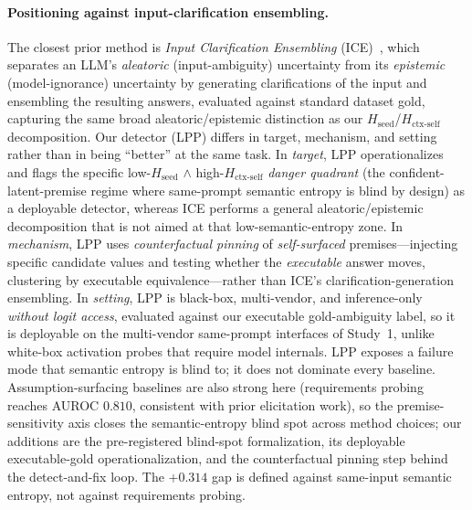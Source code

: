 \documentclass[acmsmall,screen,nonacm]{acmart}
\newcommand{\Hseed}{\ensuremath{H_{\mathrm{seed}}}}
\newcommand{\Hctx}{\ensuremath{H_{\text{ctx-self}}}}
\begin{document}
\paragraph{Positioning against input-clarification ensembling.} The closest prior method is
\emph{Input Clarification Ensembling} (ICE)~\cite{hou2024decomposing}, which separates an LLM's
\emph{aleatoric} (input-ambiguity) uncertainty from its \emph{epistemic} (model-ignorance) uncertainty by
generating clarifications of the input and ensembling the resulting answers, evaluated against standard
dataset gold, capturing the same broad aleatoric/epistemic distinction as our \Hseed{}/\Hctx{}
decomposition. Our detector (LPP) differs in target, mechanism, and setting rather than in being ``better''
at the same task. In \emph{target}, LPP operationalizes and flags the specific low-\Hseed{} $\wedge$
high-\Hctx{} \emph{danger quadrant} (the confident-latent-premise regime where same-prompt semantic entropy
is blind by design) as a deployable detector, whereas ICE performs a general aleatoric/epistemic
decomposition that is not aimed at that low-semantic-entropy zone. In \emph{mechanism}, LPP uses
\emph{counterfactual pinning} of \emph{self-surfaced} premises---injecting specific candidate values and
testing whether the \emph{executable} answer moves, clustering by executable equivalence---rather than ICE's
clarification-generation ensembling. In \emph{setting}, LPP is black-box, multi-vendor, and inference-only
\emph{without logit access}, evaluated against our executable gold-ambiguity label, so it is deployable on
the multi-vendor same-prompt interfaces of Study~1, unlike white-box activation probes that require model
internals. LPP exposes a failure mode that semantic entropy is blind to; it does not
dominate every baseline. Assumption-surfacing baselines are also strong here (requirements probing reaches
AUROC $0.810$, consistent with prior elicitation work), so the premise-sensitivity axis closes the
semantic-entropy blind spot across method choices; our additions are the pre-registered blind-spot
formalization, its deployable executable-gold operationalization, and the counterfactual pinning step behind
the detect-and-fix loop. The $+0.314$ gap is defined against same-input semantic entropy, not against
requirements probing.
\end{document}
